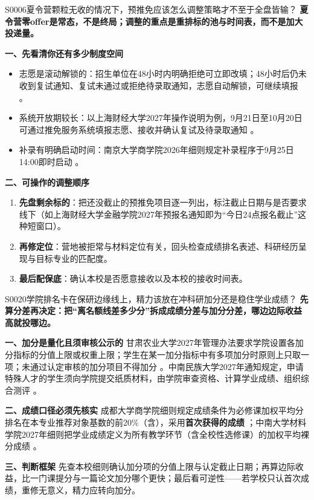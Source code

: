 \begin{qa}{S0006}{夏令营颗粒无收的情况下，预推免应该怎么调整策略才不至于全盘皆输？}
\textbf{夏令营零offer是常态，不是终局；调整的重点是重排标的池与时间表，而不是加大投递量。}

\textbf{一、先看清你还有多少制度空间}
\begin{itemize}
  \item 志愿是滚动解锁的：招生单位在48小时内明确拒绝可立即改填；48小时后仍未收到复试通知、复试未通过或拒绝待录取通知，志愿自动解锁，可继续填报 。
  \item 系统开放期较长：以上海财经大学2027年操作说明为例，9月21日至10月20日可通过推免服务系统填报志愿、接收并确认复试及待录取通知 。
  \item 补录有明确启动时间：南京大学商学院2026年细则规定补录程序于9月25日14:00即时启动 。
\end{itemize}

\textbf{二、可操作的调整顺序}
\begin{enumerate}
  \item \textbf{先盘剩余标的}：把还没截止的预推免项目逐一列出，标注截止日期与是否要求线下（如上海财经大学金融学院2027年预报名通知即为“今日24点报名截止”这种短窗口）。
  \item \textbf{再修定位}：营地被拒常与材料定位有关，回头检查成绩排名表述、科研经历呈现与目标专业的匹配度。
  \item \textbf{最后配保底}：确认本校是否愿意接收以及本校的接收时间表。
\end{enumerate}
\end{qa}

\begin{qa}{S0020}{学院排名卡在保研边缘线上，精力该放在冲科研加分还是稳住学业成绩？}
\textbf{先算分差再决定：把“离名额线差多少分”拆成成绩分差与加分分差，哪边边际收益高就投哪边。}

\textbf{一、加分是量化且须审核公示的}
甘肃农业大学2027年管理办法要求学院设置各加分指标的分值上限或权重上限；学生在某一加分指标中有多项加分时原则上只取一项；未通过认定审核的加分项目不得加分 。中南民族大学2027年通知规定，申请特殊人才的学生须向学院提交纸质材料，由学院审查资格、计算学业成绩、组织综合测评 。

\textbf{二、成绩口径必须先核实}
成都大学商学院细则规定成绩条件为必修课加权平均分排名在本专业推荐对象基数的前20\%（含），采用\textbf{首次获得的成绩} ；中南大学材料学院2027年细则把学业成绩定义为所有教学环节（含全校性选修课）的加权平均裸分成绩 。

\textbf{三、判断框架}
先查本校细则确认加分项的分值上限与认定截止日期；再算边际收益，比一门课提分与一篇论文加分哪个更快；最后看可逆性——若学校只认首次成绩，重修无意义，精力应转向加分。
\end{qa}

